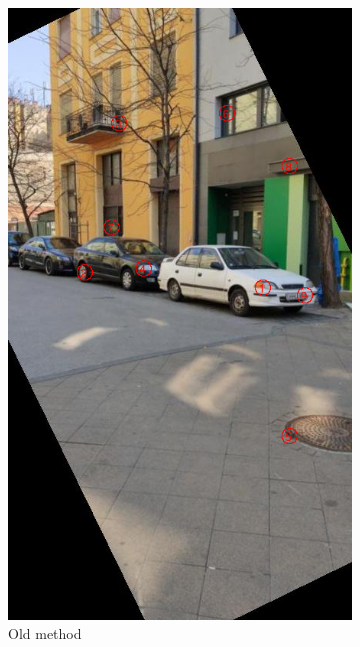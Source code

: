 \begin{figure}[tbp]
\begin{subfigure}{0.45\textwidth}
    \includegraphics[width=\textwidth, trim=0 200 0 80, clip]{figures/templates/old.png}
	\caption{Old method}
    \end{subfigure}
    \begin{subfigure}{0.45\textwidth}
        \centering

\end{subfigure}
\end{figure}
